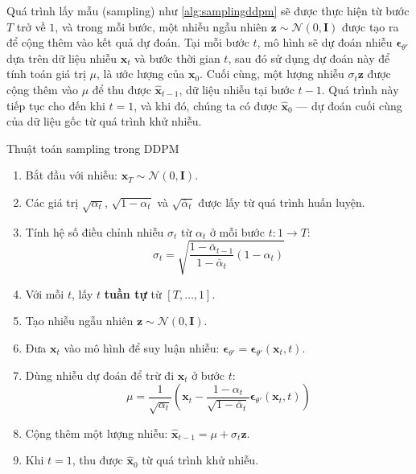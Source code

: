Quá trình lấy mẫu (sampling) như \autoref{alg:samplingddpm} sẽ được thực hiện từ bước $T$ trở về $1$, và trong mỗi bước, một nhiễu ngẫu nhiên $\mathbf{z} \sim \mathcal{N}(0, \mathbf{I})$ được tạo ra để cộng thêm vào kết quả dự đoán. Tại mỗi bước $t$, mô hình sẽ dự đoán nhiễu $\boldsymbol{\epsilon}_{\theta'}$ dựa trên dữ liệu nhiễu $\mathbf{x}_t$ và bước thời gian $t$, sau đó sử dụng dự đoán này để tính toán giá trị $\mu$, là ước lượng của $\mathbf{x}_0$. Cuối cùng, một lượng nhiễu $\sigma_t \mathbf{z}$ được cộng thêm vào $\mu$ để thu được $\hat{\mathbf{x}}_{t-1}$, dữ liệu nhiễu tại bước $t-1$. Quá trình này tiếp tục cho đến khi $t = 1$, và khi đó, chúng ta có được $\hat{\mathbf{x}}_0$ — dự đoán cuối cùng của dữ liệu gốc từ quá trình khử nhiễu.



\begin{algorithm}[H]
	\caption{Thuật toán sampling trong DDPM}
	\label{alg:samplingddpm}
	\setlength{\baselineskip}{10pt}
	\begin{enumerate}
		\item Bắt đầu với nhiễu: $\mathbf{x}_T \sim \mathcal{N}(0, \mathbf{I})$.
		
		\item Các giá trị $\sqrt{\alpha_t}$, $\sqrt{1 - \alpha_t}$ và $\sqrt{\bar{\alpha}_t}$ được lấy từ quá trình huấn luyện.
		
		\item Tính hệ số điều chỉnh nhiễu $\sigma_t$ từ $\alpha_t$ ở mỗi bước $t: 1 \rightarrow T$:
		\[
		\sigma_t = \sqrt{\frac{1 - \bar{\alpha}_{t-1}}{1 - \bar{\alpha}_t} (1 - \alpha_t)}
		\]
		
		\item Với mỗi $t$, lấy $t$ \textbf{tuần tự} từ $[T, \dots, 1]$.
		
		\item Tạo nhiễu ngẫu nhiên $\mathbf{z} \sim \mathcal{N}(0, \mathbf{I})$.
		
		\item Đưa $\mathbf{x}_t$ vào mô hình để suy luận nhiễu: $\boldsymbol{\epsilon}_{\theta'} = \boldsymbol{\epsilon}_{\theta'}(\mathbf{x}_t, t)$.
		
		\item Dùng nhiễu dự đoán để trừ đi $\mathbf{x}_t$ ở bước $t$:
		\[
		\mu = \frac{1}{\sqrt{\alpha_t}} \left( \mathbf{x}_t - \frac{1 - \alpha_t}{\sqrt{1 - \bar{\alpha}_t}} \boldsymbol{\epsilon}_{\theta'}(\mathbf{x}_t, t) \right)
		\]
		
		\item Cộng thêm một lượng nhiễu: $\hat{\mathbf{x}}_{t-1} = \mu + \sigma_t \mathbf{z}$.
		
		\item Khi $t = 1$, thu được $\hat{\mathbf{x}}_0$ từ quá trình khử nhiễu.
	\end{enumerate}

\end{algorithm}

